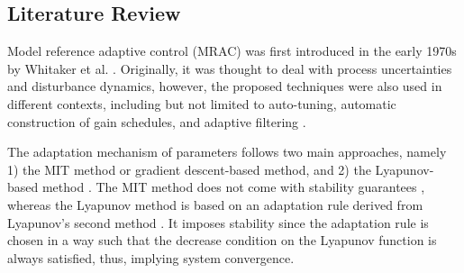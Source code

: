 \subsection{Literature Review}
\label{sec:related-work}
Model reference adaptive control (MRAC) was first introduced in the early 1970s by Whitaker et al. \cite{whitakerDesignModelReference1958}. Originally, it was thought to deal with process uncertainties and disturbance dynamics, however, the proposed techniques were also used in different contexts, including but not limited to auto-tuning, automatic construction of gain schedules, and adaptive filtering \cite{astromTheoryApplicationsAdaptive1983, astromHistoryAdaptiveControl2014}.

The adaptation mechanism of parameters follows two main approaches, namely 1) the MIT method or gradient descent-based method, and 2) the Lyapunov-based method \cite{astromAdaptiveControl2008}. The MIT method does not come with stability guarantees \cite{mareelsRevisitingMitRule1987}, whereas the Lyapunov method is based on an adaptation rule derived from Lyapunov's second method \cite{shackclothSynthesisModelReference1965}. It imposes stability since the adaptation rule is chosen in a way such that the decrease condition on the Lyapunov function is always satisfied, thus, implying system convergence.



